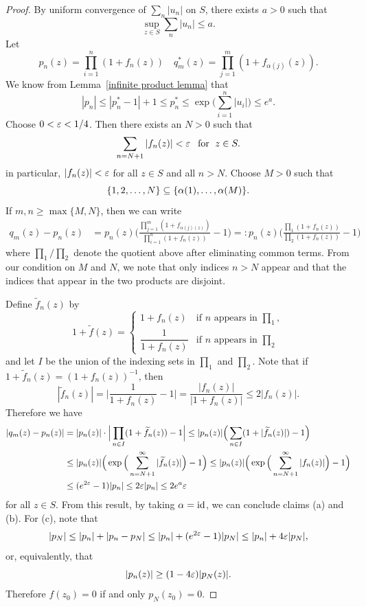 \begin{proof}
By uniform convergence of $\sum_n|u_n|$ on $S$, there exists $a>0$ such that
\[\sup_{z\in S}\sum_n|u_n|\leq a.\]
Let
\[p_n(z)=\prod_{i=1}^{n}(1+f_n(z))\quad q_m^*(z)=\prod_{j=1}^{m}(1+f_{\alpha(j)}(z)).\]
We know from Lemma~\ref{infinite product lemma} that
\[|p_n|\leq|p_n^*-1|+1\leq p_n^*\leq\exp\Big(\sum_{i=1}^{n}|u_i|\Big)\leq e^a.\]
Choose $0<\varepsilon<1/4$. Then there exists an $N>0$ such that
\[\sum_{n=N+1}|f_n(z)|<\varepsilon\hspace{8pt}\text{for}\hspace{6pt} z\in S.\]
in particular, $|f_n(z)|<\varepsilon$ for all $z\in S$ and all $n>N$. Choose $M>0$ such that
\[\{1,2,\dots,N\}\subseteq\{\alpha(1),\dots,\alpha(M)\}.\]
If $m,n\geq\max\{M,N\}$, then we can write
\begin{align*}
q_m(z)-p_n(z)&=p_n(z)\Big(\frac{\prod_{j=1}^{m}(1+f_{\alpha(j)(z)})}{\prod_{i=1}^{n}(1+f_n(z))}-1\Big)=:p_n(z)\Big(\frac{\prod_1(1+f_n(z))}{\prod_{2}(1+f_n(z))}-1\Big)
\end{align*}
where $\prod_1/\prod_2$ denote the quotient above after eliminating common terms. From our condition on $M$ and $N$, we note that only
indices $n>N$ appear and that the indices that appear in the two products are disjoint.\par
Define $\widetilde{f}_n(z)$ by 
\[1+\widetilde{f}(z)=\begin{cases}
1+f_n(z)&\text{if $n$ appears in $\prod_1$},\\
\dfrac{1}{1+f_n(z)}&\text{if $n$ appears in $\prod_2$}
\end{cases}\]
and let $I$ be the union of the indexing sets in $\prod_1$ and $\prod_2$. Note that if $1+\widetilde{f}_n(z)=(1+f_n(z))^{-1}$, then
\[|\widetilde{f}_n(z)|=\Big|\frac{1}{1+f_n(z)}-1\Big|=\frac{|f_n(z)|}{|1+f_n(z)|}\leq 2|f_n(z)|.\]
Therefore we have
\begin{align*}
|q_m(z)-p_n(z)|&=|p_n(z)|\cdot\Big|\prod_{n\in I}(1+\widetilde{f}_n(z))-1\Big|\leq|p_n(z)|\Big(\sum_{n\in I}(1+|\widetilde{f}_n(z)|)-1\Big)\\
&\leq |p_n(z)|\Big(\exp\Big(\sum_{n=N+1}^{\infty}|\widetilde{f}_n(z)|\Big)-1\Big)\leq|p_n(z)|\Big(\exp\Big(\sum_{n=N+1}^{\infty}|f_n(z)|\Big)-1\Big)\\
&\leq(e^{2\varepsilon}-1)|p_n|\leq 2\varepsilon|p_n|\leq 2e^{a}\varepsilon
\end{align*}
for all $z\in S$. From this result, by taking $\alpha=\mathrm{id}$, we can conclude claims (a) and (b). For (c), note that
\begin{align*}
|p_N|\leq|p_n|+|p_n-p_N|\leq |p_n|+(e^{2\varepsilon}-1)|p_N|\leq|p_n|+4\varepsilon|p_N|,
\end{align*}
or, equivalently, that
\[|p_n(z)|\geq(1-4\varepsilon)|p_N(z)|.\]
Therefore $f(z_0)=0$ if and only $p_N(z_0)=0$.
\end{proof}

